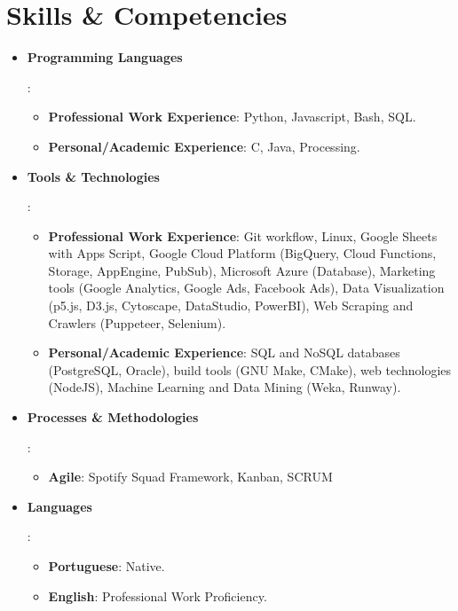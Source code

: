 \documentclass[letterpaper,11pt]{article}
\newcommand{\resumeItem}[2]{
  \item\small{
    \textbf{#1}{: #2 \vspace{-2pt}}
  }
}
\newcommand{\resumeItemListStart}{\begin{itemize}[leftmargin=*]}
\newcommand{\resumeItemListEnd}{\end{itemize}\vspace{-5pt}}
\begin{document}
\section{Skills \& Competencies}
 \resumeItemListStart
    \resumeItem{Programming Languages}{
        \resumeItemListStart
            \resumeItem{Professional Work Experience}{Python, Javascript, Bash, SQL.}
            \resumeItem{Personal/Academic Experience}{C, Java, Processing.}
        \resumeItemListEnd
    }
    \resumeItem{Tools \& Technologies}{
        \resumeItemListStart
            \resumeItem{Professional Work Experience}{Git workflow, Linux, Google Sheets with Apps Script, Google Cloud Platform (BigQuery, Cloud Functions, Storage, AppEngine, PubSub), Microsoft Azure (Database), Marketing tools (Google Analytics, Google Ads, Facebook Ads), Data Visualization (p5.js, D3.js, Cytoscape, DataStudio, PowerBI), Web Scraping and Crawlers (Puppeteer, Selenium).}
            \resumeItem{Personal/Academic Experience}{SQL and NoSQL databases (PostgreSQL, Oracle), build tools (GNU Make, CMake), web technologies (NodeJS), Machine Learning and Data Mining (Weka, Runway).}
        \resumeItemListEnd
    }
    \resumeItem{Processes \& Methodologies}{
        \resumeItemListStart
            \resumeItem{Agile}{Spotify Squad Framework, Kanban, SCRUM}
        \resumeItemListEnd
    }
    \resumeItem{Languages}{
        \resumeItemListStart
            \resumeItem{Portuguese}{Native.}
            \resumeItem{English}{Professional Work Proficiency.}
        \resumeItemListEnd
    }
 \resumeItemListEnd

\end{document}
